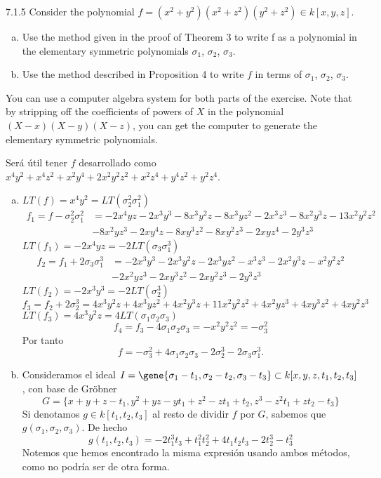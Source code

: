 \documentclass[twoside]{article}
\begin{document}
\begin{ejercicio}{7.1.5}
Consider the polynomial
$f = (x^2 + y^2)(x^2 + z^2)(y^2 + z^2) ∈ k[x, y, z]$.
\begin{enumerate}[a.]
\item Use the method given in the proof of Theorem 3 to write f as a polynomial in the
elementary symmetric polynomials $σ_1$, $σ_2$, $σ_3$.
\item Use the method described in Proposition 4 to write $f$ in terms of $σ_1$, $σ_2$, $σ_3$.
\end{enumerate}

 You can use a computer algebra system for both parts of the exercise. Note that by
stripping off the coefficients of powers of $X$ in the polynomial $(X − x)(X − y)(X − z)$,
you can get the computer to generate the elementary symmetric polynomials.
 
\end{ejercicio}
\begin{solucion}
Será útil tener $f$ desarrollado como $x^4y^2 + x^4z^2 + x^2y^4 + 2x^2y^2z^2 + x^2z^4 + y^4z^2 + y^2z^4$.
\begin{enumerate}[a.]
\item $LT(f)=x^4y^2=LT(\sigma_2^2\sigma_1^2)$
\begin{align*}
f_1=f-\sigma_2^2\sigma_1^2&=-2x^4yz - 2x^3y^3 - 8x^3y^2z - 8x^3yz^2 - 2x^3z^3 - 8x^2y^3z - 13x^2y^2z^2\\ &- 8x^2yz^3 - 2xy^4z - 8xy^3z^2 - 8xy^2z^3 - 2xyz^4 - 2y^3z^3
\end{align*}
$LT(f_1)=-2x^4yz=-2LT(\sigma_3\sigma_1^3)$
\begin{align*}
f_2=f_1+2\sigma_3\sigma_1^3&=-2x^3y^3 - 2x^3y^2z - 2x^3yz^2 - x^3z^3 - 2x^2y^3z - x^2y^2z^2\\
& - 2x^2yz^3 - 2xy^3z^2 - 2xy^2z^3 - 2y^3z^3
\end{align*}
$LT(f_2)=-2x^3y^3=-2LT(\sigma_2^3)$
\[
f_3=f_2+2\sigma_2^3=4x^3y^2z + 4x^3yz^2 + 4x^2y^3z + 11x^2y^2z^2 + 4x^2yz^3 + 4xy^3z^2 + 4xy^2z^3
\]
$LT(f_3)=4x^3y^2z=4LT(\sigma_1\sigma_2\sigma_3)$
\[
f_4=f_3-4\sigma_1\sigma_2\sigma_3=-x^2y^2z^2=-\sigma_3^2
\]
Por tanto
\[
f=-\sigma_3^2+4\sigma_1\sigma_2\sigma_3-2\sigma_2^3-2\sigma_3\sigma_1^3.
\]
\item Consideramos el ideal $I=\gene{\sigma_1-t_1,\sigma_2-t_2,\sigma_3-t_3}\subset k[x,y,z,t_1,t_2,t_3]$, con base de Gröbner
\[
G=\{x + y + z - t_1, y^2 + yz - yt_1 + z^2 - zt_1 + t_2, z^3 - z^2t_1 + zt_2 - t_3\}
\]
Si denotamos $g\in k[t_1,t_2,t_3]$ al resto de dividir $f$ por $G$, sabemos que $g(\sigma_1,\sigma_2,\sigma_3)$. De hecho
$$
g(t_1,t_2,t_3)= -2t_1^3t_3 + t_1^2t_2^2 + 4t_1t_2t_3 - 2t_2^3 - t_3^2
$$
Notemos que hemos encontrado la misma expresión usando ambos métodos, como no podría ser de otra forma.
\end{enumerate}



\end{solucion}
\newpage
\end{document}
